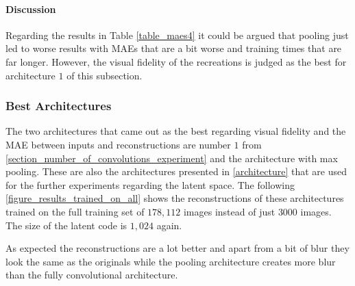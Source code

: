 \paragraph{Discussion}


Regarding the results in Table \autoref{table_maes4} it could be argued that pooling just led to worse results with
MAEs that are a bit worse and training times that are far longer. However, the visual fidelity of the recreations
is judged as the best for architecture $1$ of this subsection.


\subsubsection{Best Architectures}

The two architectures that came out as the best regarding visual fidelity and the MAE between inputs and 
reconstructions are number $1$ from \autoref{section_number_of_convolutions_experiment} and the architecture
with max pooling. These are also the architectures presented in \autoref{architecture} that are used
for the further experiments regarding the latent space. The following \autoref{figure_results_trained_on_all}
shows the reconstructions of these architectures trained on the full training set of $178,112$ images instead
of just $3000$ images. The size of the latent code is $1,024$ again.

As expected the reconstructions are a lot better and apart from a bit of blur they look the same as the originals
while the pooling architecture creates more blur than the fully convolutional architecture.

